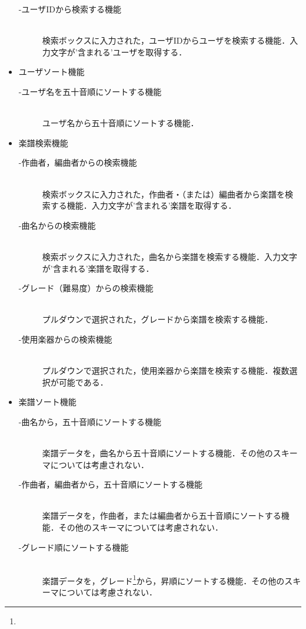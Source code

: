\documentclass[11pt]{jsreport}
\begin{document}
\begin{itemize}
\begin{description}
        \item[-ユーザIDから検索する機能] \mbox{}\\
            検索ボックスに入力された，ユーザIDからユーザを検索する機能．入力文字が'含まれる'ユーザを取得する．
    \end{description}
    \item ユーザソート機能
    \begin{description}
        \item[-ユーザ名を五十音順にソートする機能] \mbox{}\\
            ユーザ名から五十音順にソートする機能．
    \end{description}
    \item 楽譜検索機能
    \begin{description}
        \item[-作曲者，編曲者からの検索機能]\mbox{}\\
            検索ボックスに入力された，作曲者・（または）編曲者から楽譜を検索する機能．入力文字が'含まれる'楽譜を取得する．
        \item[-曲名からの検索機能] \mbox{}\\
            検索ボックスに入力された，曲名から楽譜を検索する機能．入力文字が'含まれる'楽譜を取得する．
        \item[-グレード（難易度）からの検索機能] \mbox{}\\
            プルダウンで選択された，グレードから楽譜を検索する機能．
        \item[-使用楽器からの検索機能] \mbox{}\\
            プルダウンで選択された，使用楽器から楽譜を検索する機能．複数選択が可能である．
    \end{description}
    \item 楽譜ソート機能
    \begin{description}
        \item[-曲名から，五十音順にソートする機能]\mbox{}\\
            楽譜データを，曲名から五十音順にソートする機能．その他のスキーマについては考慮されない．
        \item[-作曲者，編曲者から，五十音順にソートする機能] \mbox{}\\
            楽譜データを，作曲者，または編曲者から五十音順にソートする機能．その他のスキーマについては考慮されない．
        \item[-グレード順にソートする機能] \mbox{}\\
            楽譜データを，グレード\footnote[1]{}から，昇順にソートする機能．その他のスキーマについては考慮されない．

\end{description}
\end{itemize}
\end{document}
